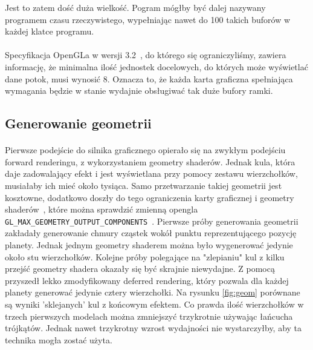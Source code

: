 Jest to zatem dość duża wielkość. Pogram mógłby być dalej nazywany programem czasu rzeczywistego, wypełniając nawet do 100 takich buforów w każdej klatce programu.

\paragraph{}

Specyfikacja OpenGLa w wersji 3.2~\cite{ogl:spec}, do którego się ograniczyliśmy, zawiera informację, że minimalna ilość jednostek docelowych, do których może wyświetlać dane potok, musi wynosić 8. Oznacza to, że każda karta graficzna spełniająca wymagania będzie w stanie wydajnie obsługiwać tak duże bufory ramki.

\subsection{Generowanie geometrii}\label{sub:generowanie geometrii}
\paragraph{}

Pierwsze podejście do silnika graficznego opierało się na zwykłym podejściu forward renderingu, z wykorzystaniem geometry shaderów. Jednak kula, która daje zadowalający efekt i jest wyświetlana przy pomocy zestawu wierzchołków, musiałaby ich mieć około tysiąca. Samo przetwarzanie takiej geometrii jest kosztowne, dodatkowo doszły do tego ograniczenia karty graficznej i geometry shaderów~\cite{ogl:geom}, które można sprawdzić zmienną opengla \texttt{GL\_MAX\_GEOMETRY\_OUTPUT\_COMPONENTS}~\cite{ogl:get}. Pierwsze próby generowania geometrii zakładały generowanie chmury cząstek wokół punktu reprezentującego pozycję planety. Jednak jednym geometry shaderem można było wygenerować jedynie około stu wierzchołków. Kolejne próby polegające na "zlepianiu" kul z kilku przejść geometry shadera okazały się być skrajnie niewydajne. Z pomocą przyszedł lekko zmodyfikowany deferred rendering, który pozwala dla każdej planety generować jedynie cztery wierzchołki. Na rysunku \hyperref[fig:geom]{\ref*{fig:geom}} porównane są wyniki 'sklejanych' kul z końcowym efektem. Co prawda ilość wierzchołków w trzech pierwszych modelach można zmniejszyć trzykrotnie używając łańcucha trójkątów. Jednak nawet trzykrotny wzrost wydajności nie wystarczyłby, aby ta technika mogła zostać użyta.

